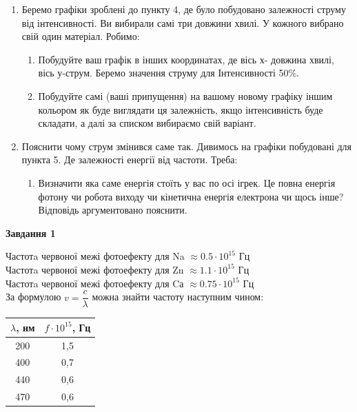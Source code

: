 \documentclass[a4paper,14pt]{extreport}
\begin{document}
\begin{enumerate}
		\item Беремо  графіки зроблені до пункту 4, де було побудовано залежності струму від інтенсивності. Ви вибирали самі три довжини хвилі. У кожного вибрано свій один матеріал. Робимо:
		\begin{enumerate}[label=2.\arabic*]
			\item Побудуйте ваш графік в інших координатах, де вісь х- довжина хвилі, вісь у-струм. Беремо значення струму для Інтенсивності 50\%.
			\item Побудуйте самі (ваші припущення) на вашому новому графіку іншим кольором як буде виглядати ця залежність, якщо інтенсивність буде складати, а далі за списком вибираємо свій варіант.
		\end{enumerate}
		\item Пояснити чому струм змінився саме так. Дивимось на графіки побудовані для пункта 5. Де залежності енергії від частоти. Треба:
		\begin{enumerate}[label=3.\arabic*]
			\item Визначити яка саме енергія стоїть у вас по осі ігрек. Це повна енергія фотону чи робота виходу чи кінетична енергія електрона чи щось інше? Відповідь аргументовано пояснити.
		\end{enumerate}
\end{enumerate}
\newpage
	
\begin{center}
\textbf{Завдання 1}
\end{center}


Частотa червоної межі фотоефекту для Na $\approx  0.5 \cdot 10^{15}$ Гц \\
Частотa червоної межі фотоефекту для Zn $\approx  1.1 \cdot 10^{15}$ Гц \\
Частотa червоної межі фотоефекту для Cа $\approx  0.75 \cdot  10^{15}$ Гц\\ 
	

	За формулою $v = \dfrac{c}{\lambda}$ можна знайти частоту наступним чином:
	
	
	\begin{table}[h]
		\begin{center}
			\begin{tabular}{|c|c|}
			\hline
			$\lambda$, нм & $f \cdot 10^{15}$,  Гц \\ \hline
			200               & 1,5                   \\ \hline
			400               & 0,7                  \\ \hline
			440               & 0,6                \\ \hline
			470               & 0,6                  \\ \hline
			\end{tabular}
		\end{center}
	\end{table}
	
\end{document}
